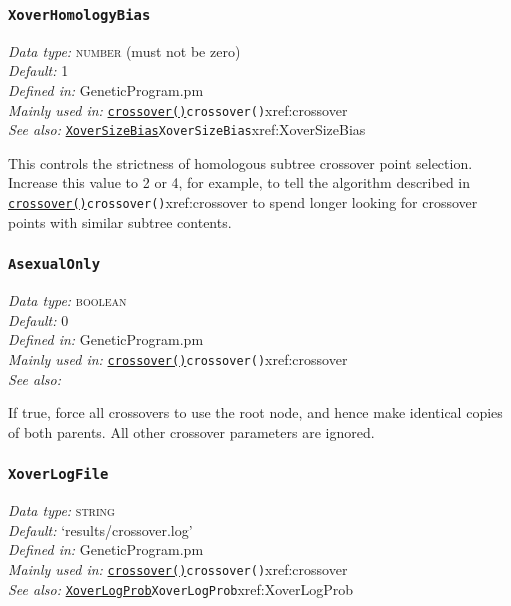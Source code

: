 \documentclass[a4paper]{article}
\begin{document}
\subsubsection{\texttt{XoverHomologyBias}}\label{xref:XoverHomologyBias}
\begin{flushleft}
\textit{Data type:} \textsc{number} (must not be zero)\\
\textit{Default:} 1\\
\textit{Defined in:} GeneticProgram.pm\\
\textit{Mainly used in:} \hyperref[no]{\texttt{crossover()}}{\texttt{crossover()}}{xref:crossover}\\
\textit{See also:} \hyperref[no]{\texttt{XoverSizeBias}}{\texttt{XoverSizeBias}}{xref:XoverSizeBias}
\end{flushleft}

This controls the strictness of homologous subtree crossover point
selection.  Increase this value to 2 or 4, for example, to tell the
algorithm described in \hyperref[no]{\texttt{crossover()}}{\texttt{crossover()}}{xref:crossover} to spend longer looking
for crossover points with similar subtree contents.


\subsubsection{\texttt{AsexualOnly}}\label{xref:AsexualOnly}
\begin{flushleft}
\textit{Data type:} \textsc{boolean}\\
\textit{Default:} 0\\
\textit{Defined in:} GeneticProgram.pm\\
\textit{Mainly used in:} \hyperref[no]{\texttt{crossover()}}{\texttt{crossover()}}{xref:crossover}\\
\textit{See also:}
\end{flushleft}

If true, force all crossovers to use the root node, and hence make
identical copies of both parents.  All other crossover parameters are
ignored.

\subsubsection{\texttt{XoverLogFile}}\label{xref:XoverLogFile}
\begin{flushleft}
\textit{Data type:} \textsc{string}\\
\textit{Default:} `results/crossover.log'\\
\textit{Defined in:} GeneticProgram.pm\\
\textit{Mainly used in:} \hyperref[no]{\texttt{crossover()}}{\texttt{crossover()}}{xref:crossover}\\
\textit{See also:} \hyperref[no]{\texttt{XoverLogProb}}{\texttt{XoverLogProb}}{xref:XoverLogProb}
\end{flushleft}
\end{document}
